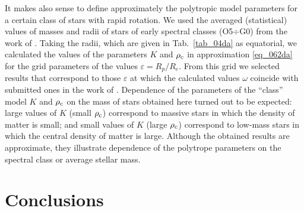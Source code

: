 \documentclass{caosp308}
\begin{document}
It makes also sense to define approximately the polytropic model parameters for a certain class of stars with rapid rotation. We used the averaged (statistical) values of masses and radii of stars of early spectral classes (O5$\div$G0) from the work of \citet{1965Obs....85..166M}. Taking the radii, which are given in Tab.~\ref{tab_04da} as equatorial, we calculated the values of the parameters $K$ and $\rho_{\rm c}$ in approximation \eqref{eq_062da} for the grid parameters of the values $\varepsilon=R_p/R_e$. From this grid we selected results that correspond to those $\varepsilon$ at which the calculated values $\omega$ coincide with submitted ones in the work of \citet{1965Obs....85..166M}. 
Dependence of the parameters of the ``class'' model $K$ and $\rho_{\rm c}$ on the mass of stars obtained here turned out to be expected: large values of $K$ (small $\rho_{\rm c}$) correspond to massive stars in which the density of matter is small; and small values of $K$ (large $\rho_{\rm c}$) correspond to low-mass stars in which the central density of matter is large. Although the obtained results are approximate, they illustrate dependence of the polytrope parameters on the spectral class or average stellar mass.

\section{Conclusions}
\label{sect_08da}
\end{document}
